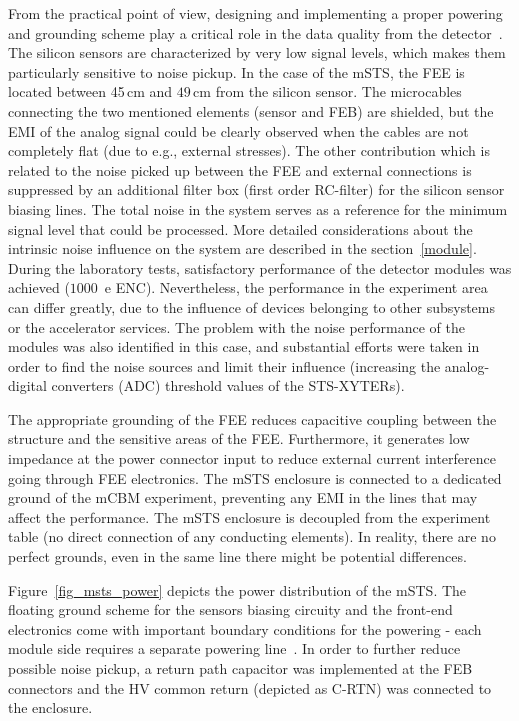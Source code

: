 From the practical point of view, designing and implementing a proper powering and grounding scheme play a critical role in the data quality from the detector~\cite{Bobillier:1159563}. The silicon sensors are characterized by very low signal levels, which makes them particularly sensitive to noise pickup. In the case of the \gls{mSTS}, the \gls{FEE} is located between 45\,cm and $49$\,cm from the silicon sensor. The microcables connecting the two mentioned elements (sensor and \gls{FEB}) are shielded, but the \gls{EMI} of the analog signal could be clearly observed when the cables are not completely flat (due to e.g., external stresses).  The other contribution which is related to the noise picked up between the \gls{FEE} and external connections is suppressed by an additional filter box (first order RC-filter) for the silicon sensor biasing lines. The total noise in the system serves as a reference for the minimum signal level that could be processed. More detailed considerations about the intrinsic noise influence on the system are described in the section~\ref{module}. During the laboratory tests, satisfactory performance of the detector modules was achieved ($1000$~e \gls{ENC}). Nevertheless, the performance in the experiment area can differ greatly, due to the influence of devices belonging to other subsystems or the accelerator services. The problem with the noise performance of the modules was also identified in this case, and substantial efforts were taken in order to find the noise sources and limit their influence (increasing the analog-digital converters (\gls{ADC}) threshold values of the STS-XYTERs). 

The appropriate grounding of the \gls{FEE} reduces capacitive coupling between the structure and the sensitive areas of the \gls{FEE}. Furthermore, it generates low impedance at the power connector input to reduce external current interference going through FEE electronics. The \gls{mSTS} enclosure is connected to a dedicated ground of the \gls{mCBM} experiment, preventing any \gls{EMI} in the lines that may affect the performance. The \gls{mSTS} enclosure is decoupled from the experiment table (no direct connection of any conducting elements). In reality, there are no perfect grounds, even in the same line there might be potential differences. 

Figure~\ref{fig_msts_power} depicts the power distribution of the \gls{mSTS}. The floating ground scheme for the sensors biasing circuity and the front-end electronics come with important boundary conditions for the powering - each module side requires a separate powering line~\cite{RodriguezRodriguez2020}. In order to further reduce possible noise pickup, a return path capacitor was implemented at the \gls{FEB} connectors and the \gls{HV} common return (depicted as C-RTN) was connected to the enclosure.

